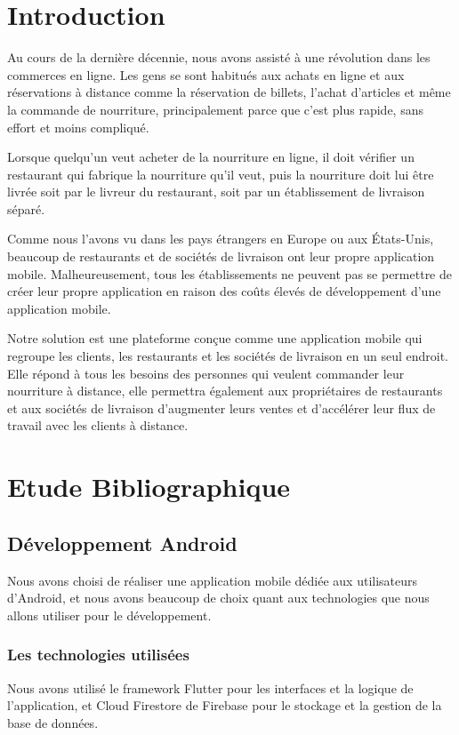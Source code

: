 \documentclass[french, a4paper, french]{report}
\begin{document}
\newpage
\chapter*{Introduction}
    Au cours de la dernière décennie, nous avons assisté à une révolution dans les commerces en ligne. Les gens se sont habitués aux achats en ligne et aux réservations à distance comme la réservation de billets, l'achat d'articles et même la commande de nourriture, principalement parce que c'est plus rapide, sans effort et moins compliqué.

Lorsque quelqu'un veut acheter de la nourriture en ligne, il doit vérifier un restaurant qui fabrique la nourriture qu'il veut, puis la nourriture doit lui être livrée soit par le livreur du restaurant, soit par un établissement de livraison séparé.

Comme nous l'avons vu dans les pays étrangers en Europe ou aux États-Unis, beaucoup de restaurants et de sociétés de livraison ont leur propre application mobile. Malheureusement, tous les établissements ne peuvent pas se permettre de créer leur propre application en raison des coûts élevés de développement d'une application mobile.

Notre solution est une plateforme conçue comme une application mobile qui regroupe les clients, les restaurants et les sociétés de livraison en un seul endroit. Elle répond à tous les besoins des personnes qui veulent commander leur nourriture à distance, elle permettra également aux propriétaires de restaurants et aux sociétés de livraison d'augmenter leurs ventes et d'accélérer leur flux de travail avec les clients à distance.


\newpage
\chapter{Etude Bibliographique}
	\section{Développement Android} Nous avons choisi de réaliser une application mobile dédiée aux utilisateurs d'Android, et nous avons beaucoup de choix quant aux technologies que nous allons utiliser pour le développement.
		\subsection{Les technologies utilisées} Nous avons utilisé le framework Flutter pour les interfaces et la logique de l'application, et Cloud Firestore de Firebase pour le stockage et la gestion de la base de données.
		
\end{document}
